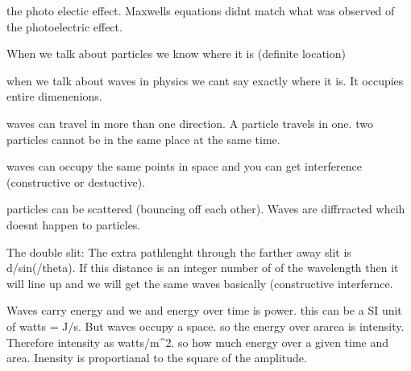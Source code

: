 the photo electic effect. Maxwells equations didnt match what was observed of the photoelectric effect. 

When we talk about particles we know where it is (definite location)

when we talk about waves in physics we cant say exactly where it is. It occupies entire dimenenions.

waves can travel in more than one direction. A particle travels in one. 
two particles cannot be in the same place at the same time.

waves can occupy the same points in space and you can get interference (constructive or destuctive). 

particles can be scattered (bouncing off each other). Waves are diffrracted whcih doesnt happen to particles. 

The double slit:
    The extra pathlenght through the farther away slit is d\cdot /sin(/theta). If this distance is an integer number of of the wavelength then it will line up and we will get the same waves basically (constructive interfernce. 

Waves carry energy and we and energy over time is power. this can be a SI unit of watts = J/s. But waves occupy a space. so the energy over ararea is intensity. Therefore intensity as watts/m^2. so how much energy over a given time and area. Inensity is proportianal to the square of the amplitude. 

